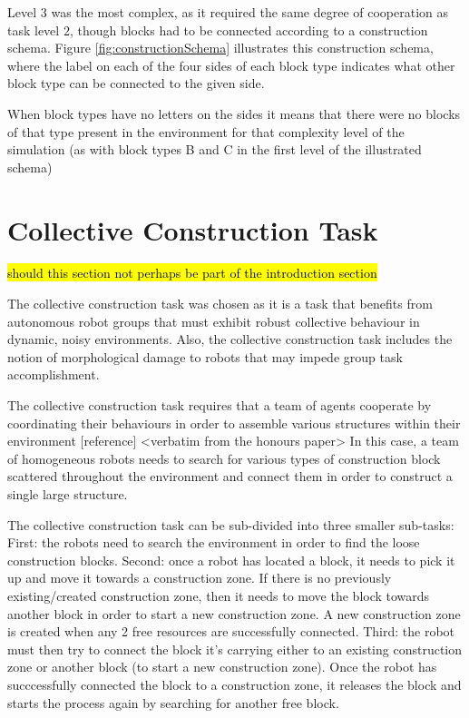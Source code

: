 Level $3$ was the most complex, as it required the same degree of cooperation as task level
$2$, though blocks had to be connected according to a construction schema.
Figure \ref{fig:constructionSchema}
illustrates this construction schema, where the label on each of the
four sides of each block type indicates what other block type can be connected to the given side.

When block types have no letters on the sides it means that there were no blocks of that type present in the environment for that complexity level of the simulation (as with block types B and C in the first level of the illustrated schema)

\section{Collective Construction Task}

\hl{should this section not perhaps be part of the introduction section}

The collective construction task was chosen as it is a task that benefits from autonomous robot groups that must exhibit robust collective behaviour in dynamic, noisy environments. Also, the collective construction task includes the notion of morphological damage to robots that may impede group task accomplishment. 

The collective construction task requires that a team of agents cooperate by coordinating their behaviours in order to assemble various structures within their environment [reference] <verbatim from the honours paper>
In this case, a team of homogeneous robots needs to search for various types of construction block scattered throughout the environment and connect them in order to construct a single large structure. 

The collective construction task can be sub-divided into three smaller sub-tasks:
	First:
		the robots need to search the environment in order to find the loose construction blocks.
	Second:
		once a robot has located a block, it needs to pick it up and move it towards a construction zone. If there is no previously existing/created construction zone, then it needs to move the block towards another block in order to start a new construction zone. A new construction zone is created when any 2 free resources are successfully connected.
	Third:
		the robot must then try to connect the block it's carrying either to an existing construction zone or another block (to start a new construction zone). Once the robot has succcessfully connected the block to a construction zone, it releases the block and starts the process again by searching for another free block.


